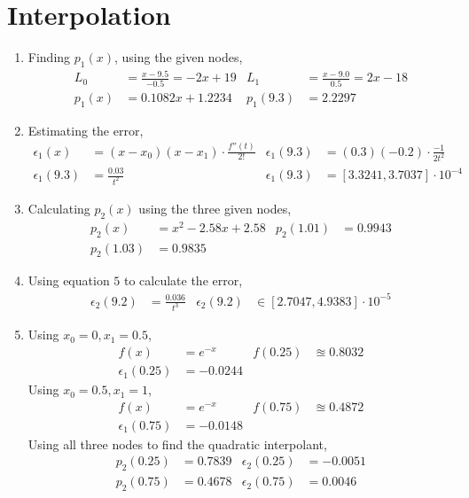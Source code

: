 \section{Interpolation}

\begin{enumerate}
    \item Finding $ p_1(x) $, using the given nodes,
          \begin{align}
              L_0      & = \frac{x - 9.5}{-0.5} = -2x + 19 &
              L_1      & = \frac{x - 9.0}{0.5} = 2x - 18     \\
              p_1(x)   & = 0.1082 x + 1.2234               &
              p_1(9.3) & = 2.2297
          \end{align}

    \item Estimating the error,
          \begin{align}
              \epsilon_1(x)   & = (x-x_0)(x-x_1) \cdot \frac{f''(t)}{2!} &
              \epsilon_1(9.3) & = (0.3)(-0.2) \cdot \frac{-1}{2t^2}        \\
              \epsilon_1(9.3) & = \frac{0.03}{t^2}                       &
              \epsilon_1(9.3) & = [3.3241, 3.7037] \cdot 10^{-4}
          \end{align}

    \item Calculating $ p_2(x) $ using the three given nodes,
          \begin{align}
              p_2(x)    & = x^{2} - 2.58 x + 2.58 &
              p_2(1.01) & = 0.9943                  \\
              p_2(1.03) & = 0.9835
          \end{align}

    \item Using equation $ 5 $ to calculate the error,
          \begin{align}
              \epsilon_2(9.2) & = \frac{0.036}{t^3}                &
              \epsilon_2(9.2) & \in [2.7047, 4.9383] \cdot 10^{-5}
          \end{align}

    \item Using $ x_0 = 0, x_1 = 0.5 $,
          \begin{align}
              f(x)             & = e^{-x}  & f(0.25) & \approxeq 0.8032 \\
              \epsilon_1(0.25) & = -0.0244
          \end{align}
          Using $ x_0 = 0.5, x_1 = 1 $,
          \begin{align}
              f(x)             & = e^{-x}  & f(0.75) & \approxeq 0.4872 \\
              \epsilon_1(0.75) & = -0.0148
          \end{align}
          Using all three nodes to find the quadratic interpolant,
          \begin{align}
              p_2(0.25) & = 0.7839 & \epsilon_2(0.25) & = -0.0051 \\
              p_2(0.75) & = 0.4678 & \epsilon_2(0.75) & = 0.0046
          \end{align}


\end{enumerate}
